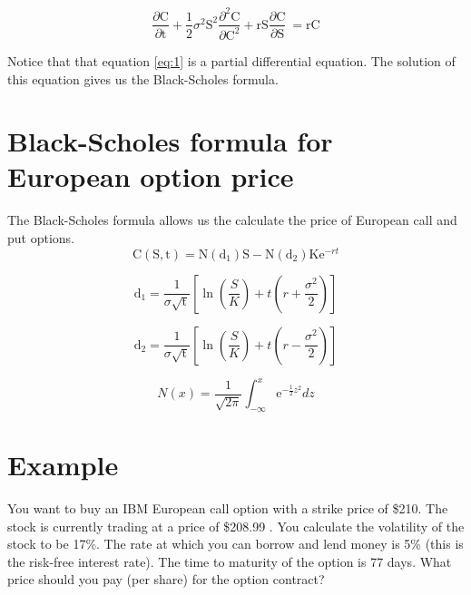 \documentclass{article}
\begin{document}
\begin{equation}
	\frac{\partial \mathrm C}{ \partial \mathrm t } + \frac{1}{2}\sigma^{2} \mathrm S^{2} \frac{\partial^{2} \mathrm C}{\partial \mathrm C^2}
	+ \mathrm r \mathrm S \frac{\partial \mathrm C}{\partial \mathrm S}\ =
	\mathrm r \mathrm C 
	\label{eq:1}
\end{equation}

Notice that that equation \eqref{eq:1} is a partial differential equation. The solution of this equation gives us the Black-Scholes formula.


\section{Black-Scholes formula for European option price}
The Black-Scholes formula allows us the calculate the price of European call and put options.
\begin{equation}
	\mathrm C(\mathrm S,\mathrm t)= \mathrm N(\mathrm d_1)\mathrm S - \mathrm N(\mathrm d_2) \mathrm K \mathrm e^{-rt}
	\label{eq:2}
\end{equation}

\begin{equation}
	\mathrm d_1= \frac{1}{\sigma \sqrt{\mathrm t}} \left[\ln{\left(\frac{S}{K}\right)} + t\left(r + \frac{\sigma^2}{2} \right) \right]
\end{equation}

\begin{equation}
	\mathrm d_2= \frac{1}{\sigma \sqrt{\mathrm t}} \left[\ln{\left(\frac{S}{K}\right)} + t\left(r - \frac{\sigma^2}{2} \right) \right]
\end{equation}

\begin{equation}
	N(x)=\frac{1}{\sqrt{2\pi}} \int_{-\infty}^{x} \mathrm e^{-\frac{1}{2}z^2} dz
	\label{eq:5}
\end{equation}


\section{Example}
You want to buy an IBM European call option with a strike price of \$210. The stock is currently trading at a price of \$208.99 . You calculate the volatility of the stock to be 17\%. 
The rate at which you can borrow and lend money is 5\% (this is the risk-free interest rate). 
The time to maturity of the option is 77 days. What price should you pay (per share) for the option contract?
\end{document}
